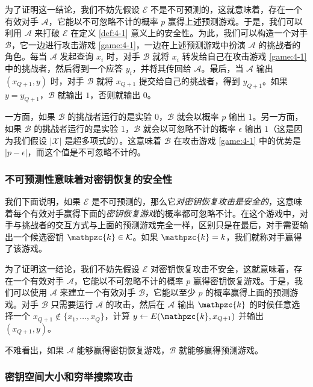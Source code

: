 为了证明这一结论，我们不妨先假设 $\mathcal{E}$ 不是不可预测的，这就意味着，存在一个有效对手 $\mathcal{A}$，它能以不可忽略不计的概率 $p$ 赢得上述预测游戏。于是，我们可以利用 $\mathcal{A}$ 来打破 $\mathcal{E}$ 在定义 \ref{def:4-1} 意义上的安全性。为此，我们可以构造一个对手 $\mathcal{B}$，它一边进行攻击游戏 \ref{game:4-1}，一边在上述预测游戏中扮演 $\mathcal{A}$ 的挑战者的角色。每当 $\mathcal{A}$ 发起查询 $x_i$ 时，对手 $\mathcal{B}$ 就将 $x_i$ 转发给自己在攻击游戏 \ref{game:4-1} 中的挑战者，然后得到一个应答 $y_i$，并将其传回给 $\mathcal{A}$。最后，当 $\mathcal{A}$ 输出 $(x_{Q+1},y)$ 时，对手 $\mathcal{B}$ 就将 $x_{Q+1}$ 提交给自己的挑战者，得到 $y_{Q+1}$。如果 $y=y_{Q+1}$，$\mathcal{B}$ 就输出 $1$，否则就输出 $0$。

一方面，如果 $\mathcal{B}$ 的挑战者运行的是实验 $0$，$\mathcal{B}$ 就会以概率 $p$ 输出 $1$。另一方面，如果 $\mathcal{B}$ 的挑战者运行的是实验 $1$，$\mathcal{B}$ 就会以可忽略不计的概率 $\epsilon$ 输出 $1$（这是因为我们假设 $|\mathcal{X}|$ 是超多项式的）。这意味着 $\mathcal{B}$ 在攻击游戏 \ref{game:4-1} 中的优势是 $|p-\epsilon|$，而这个值是不可忽略不计的。

\subsubsection{不可预测性意味着对密钥恢复的安全性}\label{subsubsec:4-1-1-2}

我们下面说明，如果 $\mathcal{E}$ 是不可预测的，那么它\emph{对密钥恢复攻击是安全的}，这意味着每个有效对手赢得下面的\emph{密钥恢复游戏}的概率都可忽略不计。在这个游戏中，对手与挑战者的交互方式与上面的预测游戏完全一样，区别只是在最后，对手需要输出一个候选密钥 $\mathpzc{k}\in\mathcal{K}$。如果 $\mathpzc{k}=k$，我们就称对手赢得了该游戏。

为了证明这一结论，我们不妨先假设 $\mathcal{E}$ 对密钥恢复攻击不安全，这就意味着，存在一个有效对手 $\mathcal{A}$，它能以不可忽略不计的概率 $p$ 赢得密钥恢复游戏。于是，我们可以使用 $\mathcal{A}$ 来建立一个有效对手 $\mathcal{B}$，它能以至少 $p$ 的概率赢得上面的预测游戏。对手 $\mathcal{B}$ 只需要运行 $\mathcal{A}$ 的攻击，然后在 $\mathcal{A}$ 输出 $\mathpzc{k}$ 的时侯任意选择一个 $x_{Q+1}\notin\{x_1,\dots,x_Q\}$，计算 $y\leftarrow E(\mathpzc{k},x_{Q+1})$ 并输出 $(x_{Q+1},y)$。

不难看出，如果 $\mathcal{A}$ 能够赢得密钥恢复游戏，$\mathcal{B}$ 就能够赢得预测游戏。

\subsubsection{密钥空间大小和穷举搜索攻击}

